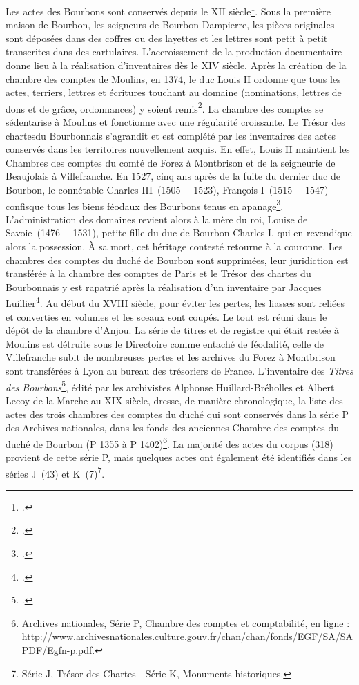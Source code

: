 \par Les actes des Bourbons sont conservés depuis le \textsc{XII} siècle\footnote{\cite{huillard-brehollesTitresMaisonDucale1867}.}. Sous la première maison de Bourbon, les seigneurs de Bourbon-Dampierre, les pièces originales sont déposées dans des coffres ou des layettes et les lettres sont petit à petit transcrites dans des cartulaires. L'accroissement de la production documentaire donne lieu à la réalisation d'inventaires dès le \textsc{XIV} siècle. Après la création de la chambre des comptes de Moulins, en 1374, le duc Louis II  ordonne que tous les actes, terriers, lettres et écritures touchant au domaine (nominations, lettres de dons et de grâce, ordonnances) y soient remis\footnote{\cite{huillard-brehollesTitresMaisonDucale1867}.}. La chambre des comptes se sédentarise à Moulins et fonctionne avec une régularité croissante. Le \og Trésor des chartes\fg \space du Bourbonnais s'agrandit et est complété par les inventaires des actes conservés dans les territoires nouvellement acquis. En effet, Louis II maintient les Chambres des comptes du comté de Forez à Montbrison et de la seigneurie de Beaujolais à Villefranche. En 1527, cinq ans après de la fuite du dernier duc de Bourbon, le connétable Charles III~(1505~-~1523), François I~(1515~-~1547) confisque tous les biens féodaux des Bourbons tenus en apanage\footnote{\cite{huillard-brehollesTitresMaisonDucale1867}.}. L'administration des domaines revient alors à la mère du roi, Louise de Savoie~(1476~-~1531), petite fille du duc de Bourbon Charles I, qui en revendique alors la possession. À sa mort, cet héritage contesté retourne à la couronne. Les chambres des comptes du duché de Bourbon sont supprimées, leur juridiction est transférée à la chambre des comptes de Paris et le Trésor des chartes du Bourbonnais y est rapatrié après la réalisation d'un inventaire par Jacques Luillier\footnote{\cite{huillard-brehollesTitresMaisonDucale1867}.}. Au début du \textsc{XVIII} siècle, pour éviter les pertes, les liasses sont reliées et converties en volumes et les sceaux sont coupés. Le tout est réuni dans le dépôt de la chambre d'Anjou. La série de titres et de registre qui était restée à Moulins est détruite sous le Directoire comme entaché de féodalité, celle de Villefranche subit de nombreuses pertes et les archives du Forez à Montbrison sont transférées à Lyon au bureau des trésoriers de France. L'inventaire des \textit{Titres des Bourbons}\footnote{\cite{huillard-brehollesTitresMaisonDucale1867}.}, édité par les archivistes Alphonse Huillard-Bréholles et Albert Lecoy de la Marche au \textsc{XIX} siècle, dresse, de manière chronologique, la liste des actes des trois chambres des comptes du duché qui sont conservés dans la série P des Archives nationales, dans les fonds des anciennes Chambre des comptes du duché de Bourbon (P 1355 à P 1402)\footnote{Archives nationales, Série P, Chambre des comptes et comptabilité, en ligne : \url{http://www.archivesnationales.culture.gouv.fr/chan/chan/fonds/EGF/SA/SAPDF/Egfn-p.pdf}.}. La majorité des actes du corpus (318) provient de cette série P, mais quelques actes ont également été identifiés dans les séries J~(43) et K~(7)\footnote{Série J, Trésor des Chartes - Série K, Monuments historiques.}. 

